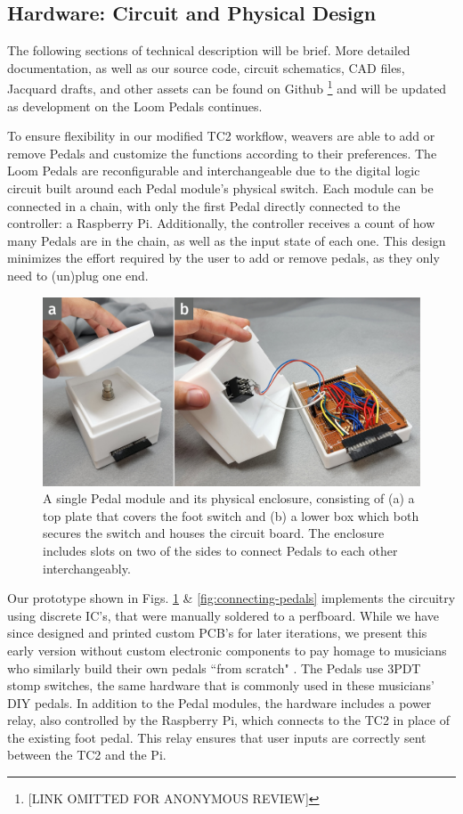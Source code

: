 \subsection{Hardware: Circuit and Physical Design}

The following sections of technical description will be brief. More detailed documentation, as well as our source code, circuit schematics, CAD files, Jacquard drafts, and other assets can be found on Github \footnote{[LINK OMITTED FOR ANONYMOUS REVIEW]} and will be updated as development on the Loom Pedals continues.

To ensure flexibility in our modified TC2 workflow, weavers are able to add or remove Pedals and customize the functions according to their preferences. The Loom Pedals are reconfigurable and interchangeable due to the digital logic circuit built around each Pedal module's physical switch. Each module can be connected in a chain, with only the first Pedal directly connected to the controller: a Raspberry Pi. Additionally, the controller receives a count of how many Pedals are in the chain, as well as the input state of each one. This design minimizes the effort required by the user to add or remove pedals, as they only need to (un)plug one end.

\begin{figure}
    \centering
    \includegraphics[width=\linewidth]{figs/LP_6_pedal-enclosure.jpg}
    \caption[Photographs of a single Pedal module.]{A single Pedal module and its physical enclosure, consisting of (a) a top plate that covers the foot switch and (b) a lower box which both secures the switch and houses the circuit board. The enclosure includes slots on two of the sides to connect Pedals to each other interchangeably.}
    \label{fig:pedal-module}
\end{figure}

Our prototype shown in Figs. \ref{fig:pedal-module} \& \ref{fig:connecting-pedals} implements the circuitry using discrete IC’s, that were manually soldered to a perfboard. While we have since designed and printed custom PCB's for later iterations, we present this early version without custom electronic components to pay homage to musicians who similarly build their own pedals ``from scratch" \cite{collins_handmade_2020}. The Pedals use 3PDT stomp switches, the same hardware that is commonly used in these musicians' DIY pedals. In addition to the Pedal modules, the hardware includes a power relay, also controlled by the Raspberry Pi, which connects to the TC2 in place of the existing foot pedal. This relay ensures that user inputs are correctly sent between the TC2 and the Pi.

